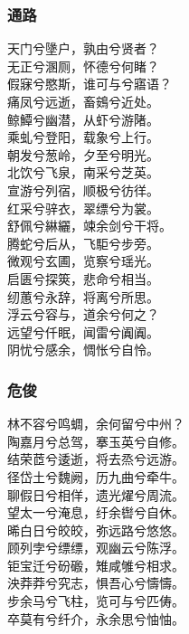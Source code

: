 \documentclass[]{article}
\begin{document}
\hypertarget{header-n277}{%
\subsubsection{通路}\label{header-n277}}

天门兮墬户，孰由兮贤者？\\
无正兮溷厕，怀德兮何睹？\\
假寐兮愍斯，谁可与兮寤语？\\
痛凤兮远逝，畜鴳兮近处。\\
鲸鱏兮幽潜，从虾兮游陼。\\
乘虬兮登阳，载象兮上行。\\
朝发兮葱岭，夕至兮明光。\\
北饮兮飞泉，南采兮芝英。\\
宣游兮列宿，顺极兮彷徉。\\
红采兮骍衣，翠缥兮为裳。\\
舒佩兮綝纚，竦余剑兮干将。\\
腾蛇兮后从，飞駏兮步旁。\\
微观兮玄圃，览察兮瑶光。\\
启匮兮探筴，悲命兮相当。\\
纫蕙兮永辞，将离兮所思。\\
浮云兮容与，道余兮何之？\\
远望兮仟眠，闻雷兮阗阗。\\
阴忧兮感余，惆怅兮自怜。

\hypertarget{header-n282}{%
\subsubsection{危俊}\label{header-n282}}

林不容兮鸣蜩，余何留兮中州？\\
陶嘉月兮总驾，搴玉英兮自修。\\
结荣茝兮逶逝，将去烝兮远游。\\
径岱土兮魏阙，历九曲兮牵牛。\\
聊假日兮相佯，遗光燿兮周流。\\
望太一兮淹息，纡余辔兮自休。\\
晞白日兮皎皎，弥远路兮悠悠。\\
顾列孛兮缥缥，观幽云兮陈浮。\\
钜宝迁兮砏磤，雉咸雊兮相求。\\
泱莽莽兮究志，惧吾心兮懤懤。\\
步余马兮飞柱，览可与兮匹俦。\\
卒莫有兮纤介，永余思兮怞怞。
\end{document}
